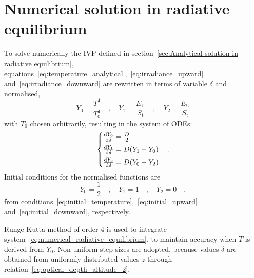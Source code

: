 \documentclass[a4paper,10pt,twocolumn,\classoptions]{article}
\begin{document}
\section{Numerical solution in radiative equilibrium}
\label{sec:Numerical solution in radiative equilibrium}
To solve numerically the IVP defined in section~\ref{sec:Analytical solution in radiative equilibrium}, equations~\eqref{eq:temperature_analytical},~\eqref{eq:irradiance_upward} and~\eqref{eq:irradiance_downward} are rewritten in terms of variable $\delta$ and normalised,
\begin{equation}
  \label{eq:normalisation}
  Y_0 = \frac{T^4}{T_0^4}
  \quad , \quad
  Y_1 = \frac{E_\text{U}}{S_\text{t}}
  \quad , \quad
  Y_2 = \frac{E_\text{U}}{S_\text{t}}
\end{equation}
with $T_0$ chosen arbitrarily, resulting in the system of ODEs:
\begin{equation}
  \label{eq:numerical_radiative_equilibrium}
  \left\{
  \begin{array}{@{}l@{}}
    \odv{Y_0}{\delta} = \frac{D}{2} \\[0.5em]
    \odv{Y_1}{\delta} = D (Y_1 - Y_0) \\[0.5em]
    \odv{Y_2}{\delta} = D (Y_0 - Y_2)
  \end{array}
  \right.
  \quad .
\end{equation}
Initial conditions for the normalised functions are
\begin{equation}
  \label{eq:initial_normalisation}
  Y_0 = \frac{1}{2}
  \quad , \quad
  Y_1 = 1
  \quad , \quad
  Y_2 = 0
  \quad ,
\end{equation}
from conditions~\eqref{eq:initial_temperature},~\eqref{eq:initial_upward} and~\eqref{eq:initial_downward}, respectively.

Runge-Kutta method of order 4 is used to integrate system~\eqref{eq:numerical_radiative_equilibrium}, to maintain accuracy when $T$ is derived from $Y_0$. Non-uniform step sizes are adopted, because values $\delta$ are obtained from uniformly distributed values $z$ through relation~\eqref{eq:optical_depth_altitude_2}.
\end{document}
